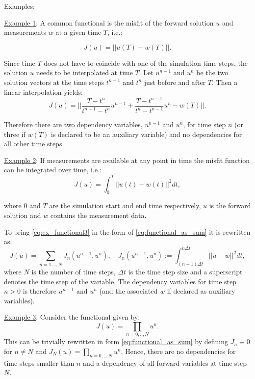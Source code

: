 Examples:

\underline{Example 1}:
A common functional is the misfit of the forward solution $u$ and measurements $w$ at a given time $T$, i.e.:

\begin{equation}
J(u) = ||u(T) - w(T)||.
\label{eq:ex_functional1}
\end{equation}

Since time $T$ does not have to coincide with one of the simulation time steps, the solution $u$ needs to be interpolated at time $T$.
Let $u^{n-1}$ and $u^{n}$ be the two solution vectors at the time steps $t^{n-1}$ and $t^{n}$ just before and after $T$.
Then a linear interpolation yields:
\begin{equation}
J(u) = ||\frac{T-t^{n}}{t^{n-1}-t^{n}}u^{n-1} + \frac{T-t^{n-1}}{t^{n}-t^{n-1}}u^{n} - w(T)||.
\label{eq:ex_functional2}
\end{equation}

Therefore there are two dependency variables, $u^{n-1}$ and $u^{n}$, for time step $n$ (or three if $w(T)$ is declared to be an auxiliary variable) and no dependencies for all other time steps.

\underline{Example 2}:
If measurements are available at any point in time the misfit function can be integrated over time, i.e.: 
\begin{equation}
J(u) = \int_0^T ||u(t) - w(t)||^2 dt,
\label{eq:ex_functional3}
\end{equation}

where $0$ and $T$ are the simulation start and end time respectively, $u$ is the forward solution and $w$ contains the measurement data.


To bring \autoref{eq:ex_functional3} in the form of \autoref{eq:functional_as_sum} it is rewritten as:
\begin{equation}
J(u) = \sum_{n=1,..,N} J_n(u^{n-1}, u^{n}), \quad J_n(u^{n-1}, u^{n}) := \int_{(n-1)\Delta t}^{n \Delta t} ||u - w||^2 dt,
\end{equation}
where $N$ is the number of time steps, $\Delta t$ is the time step size and a superscript denotes the time step of the variable.
The dependency variables for time step $n>0$ is therefore $u^{n-1}$ and $u^{n}$ (and the associated $w$ if declared as auxiliary variables).

\underline{Example 3}:
Consider the functional given by: 
\begin{equation}
J(u) = \prod_{n=0,..,N} u^{n}.
\end{equation}
This can be trivially rewritten in form \autoref{eq:functional_as_sum} by defining $J_n \equiv 0$ for $n \ne N$ and $J_N(u) = \prod_{n=0,..,N} u^{n}$.
Hence, there are no dependencies for time steps smaller than $n$ and a dependency of all forward variables at time step $N$.


